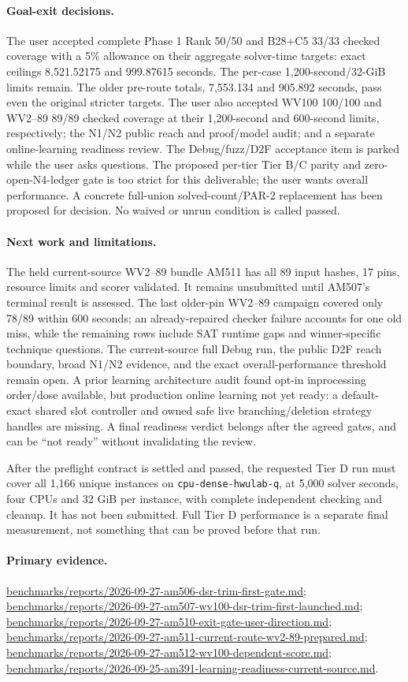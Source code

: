 \documentclass[11pt]{article}
\begin{document}
\paragraph{Goal-exit decisions.}
The user accepted complete Phase 1 Rank 50/50 and B28+C5 33/33 checked
coverage with a 5\% allowance on their aggregate solver-time targets: exact
ceilings 8,521.52175 and 999.87615 seconds. The per-case 1,200-second/32-GiB
limits remain. The older pre-route totals, 7,553.134 and 905.892 seconds,
pass even the original stricter targets. The user also accepted WV100 100/100
and WV2--89 89/89 checked coverage at their 1,200-second and 600-second
limits, respectively; the N1/N2 public reach and proof/model audit; and a
separate online-learning readiness review. The Debug/fuzz/D2F acceptance item
is parked while the user asks questions. The proposed per-tier Tier B/C parity
and zero-open-N4-ledger gate is too strict for this deliverable; the user wants
overall performance. A concrete full-union solved-count/PAR-2 replacement has
been proposed for decision. No waived or unrun condition is called passed.

\paragraph{Next work and limitations.}
The held current-source WV2--89 bundle AM511 has all 89 input hashes, 17 pins,
resource limits and scorer validated. It remains unsubmitted until AM507's
terminal result is assessed. The last older-pin WV2--89 campaign covered only
78/89 within 600 seconds; an already-repaired checker failure accounts for one
old miss, while the remaining rows include SAT runtime gaps and winner-specific
technique questions. The current-source full Debug run, the public D2F reach
boundary, broad N1/N2 evidence, and the exact overall-performance threshold
remain open. A prior learning architecture audit found opt-in inprocessing
order/dose available, but production online learning not yet ready: a
default-exact shared slot controller and owned safe live branching/deletion
strategy handles are missing. A final readiness verdict belongs after the
agreed gates, and can be ``not ready'' without invalidating the review.

After the preflight contract is settled and passed, the requested Tier D run
must cover all 1,166 unique instances on \texttt{cpu-dense-hwulab-q}, at 5,000
solver seconds, four CPUs and 32 GiB per instance, with complete independent
checking and cleanup. It has not been submitted. Full Tier D performance is a
separate final measurement, not something that can be proved before that run.

\paragraph{Primary evidence.}
\url{benchmarks/reports/2026-09-27-am506-dsr-trim-first-gate.md};
\url{benchmarks/reports/2026-09-27-am507-wv100-dsr-trim-first-launched.md};
\url{benchmarks/reports/2026-09-27-am510-exit-gate-user-direction.md};
\url{benchmarks/reports/2026-09-27-am511-current-route-wv2-89-prepared.md};
\url{benchmarks/reports/2026-09-27-am512-wv100-dependent-score.md};
\url{benchmarks/reports/2026-09-25-am391-learning-readiness-current-source.md}.
\end{document}

